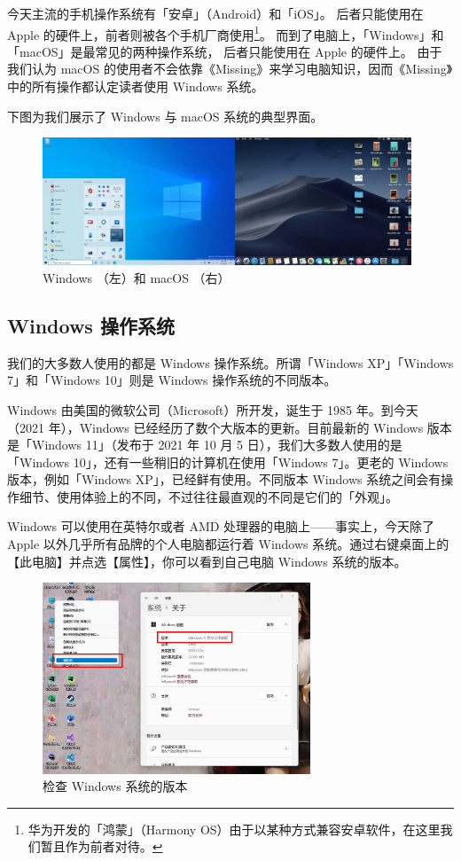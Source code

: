今天主流的手机操作系统有「安卓」（Android）和「iOS」。
后者只能使用在 Apple 的硬件上，前者则被各个手机厂商使用\footnote{华为开发的「鸿蒙」（Harmony OS）由于以某种方式兼容安卓软件，在这里我们暂且作为前者对待。}。
而到了电脑上，「Windows」和「macOS」是最常见的两种操作系统，
后者只能使用在 Apple 的硬件上。
由于我们认为 macOS 的使用者不会依靠《Missing》来学习电脑知识，因而《Missing》中的所有操作都认定读者使用 Windows 系统。

下图为我们展示了 Windows 与 macOS 系统的典型界面。

\begin{figure}[htb!]
  \centering
  \includegraphics[width=11cm]{assets/Windows_and_macOS.png}
  \caption{Windows （左）和 macOS （右）}
  \label{win-and-mac}
\end{figure}

\subsection{Windows 操作系统}

我们的大多数人使用的都是 Windows 操作系统。所谓「Windows XP」「Windows 7」和「Windows 10」则是 Windows 操作系统的不同版本。

Windows 由美国的微软公司（Microsoft）所开发，诞生于 1985 年。到今天（2021 年），Windows 已经经历了数个大版本的更新。目前最新的 Windows 版本是「Windows 11」（发布于 2021 年 10 月 5 日），我们大多数人使用的是「Windows 10」，还有一些稍旧的计算机在使用「Windows 7」。更老的 Windows 版本，例如「Windows XP」，已经鲜有使用。不同版本 Windows 系统之间会有操作细节、使用体验上的不同，不过往往最直观的不同是它们的「外观」。

Windows 可以使用在英特尔或者 AMD 处理器的电脑上——事实上，今天除了 Apple 以外几乎所有品牌的个人电脑都运行着 Windows 系统。通过右键桌面上的【此电脑】并点选【属性】，你可以看到自己电脑 Windows 系统的版本。

\begin{figure}[H]
  \centering
  \includegraphics[width=8cm]{assets/Check_Windows_version.png}
  \caption{检查 Windows 系统的版本}
  \label{check-windows-version}
\end{figure}

